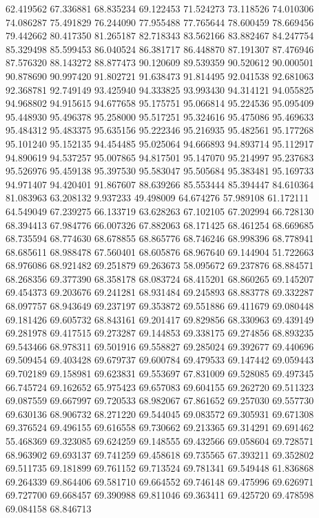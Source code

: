62.419562
67.336881
68.835234
69.122453
71.524273
73.118526
74.010306
74.086287
75.491829
76.244090
77.955488
77.765644
78.600459
78.669456
79.442662
80.417350
81.265187
82.718343
83.562166
83.882467
84.247754
85.329498
85.599453
86.040524
86.381717
86.448870
87.191307
87.476946
87.576320
88.143272
88.877473
90.120609
89.539359
90.520612
90.000501
90.878690
90.997420
91.802721
91.638473
91.814495
92.041538
92.681063
92.368781
92.749149
93.425940
94.333825
93.993430
94.314121
94.055825
94.968802
94.915615
94.677658
95.175751
95.066814
95.224536
95.095409
95.448930
95.496378
95.258000
95.517251
95.324616
95.475086
95.469633
95.484312
95.483375
95.635156
95.222346
95.216935
95.482561
95.177268
95.101240
95.152135
94.454485
95.025064
94.666893
94.893714
95.112917
94.890619
94.537257
95.007865
94.817501
95.147070
95.214997
95.237683
95.526976
95.459138
95.397530
95.583047
95.505684
95.383481
95.169733
94.971407
94.420401
91.867607
88.639266
85.553444
85.394447
84.610364
81.083963
63.208132
9.937233
49.498009
64.674276
57.989108
61.172111
64.549049
67.239275
66.133719
63.628263
67.102105
67.202994
66.728130
68.394413
67.984776
66.007326
67.882063
68.171425
68.461254
68.669685
68.735594
68.774630
68.678855
68.865776
68.746246
68.998396
68.778941
68.685611
68.988478
67.560401
68.605876
68.967640
69.144904
51.722663
68.976086
68.921482
69.251879
69.263673
58.095672
69.237876
68.884571
68.268356
69.377390
68.358178
68.083724
68.415201
68.860265
69.145207
69.454373
69.203676
69.241281
68.931484
69.245893
68.883778
69.332287
68.097757
68.943649
69.237197
69.353872
69.551886
69.411679
69.080448
69.181426
69.605732
68.843161
69.201417
69.829856
68.330963
69.439149
69.281978
69.417515
69.273287
69.144853
69.338175
69.274856
68.893235
69.543466
68.978311
69.501916
69.558827
69.285024
69.392677
69.440696
69.509454
69.403428
69.679737
69.600784
69.479533
69.147442
69.059443
69.702189
69.158981
69.623831
69.553697
67.831009
69.528085
69.497345
66.745724
69.162652
65.975423
69.657083
69.604155
69.262720
69.511323
69.087559
69.667997
69.720533
68.982067
67.861652
69.257030
69.557730
69.630136
68.906732
68.271220
69.544045
69.083572
69.305931
69.671308
69.376524
69.496155
69.616558
69.730662
69.213365
69.314291
69.691462
55.468369
69.323085
69.624259
69.148555
69.432566
69.058604
69.728571
68.963902
69.693137
69.741259
69.458618
69.735565
67.393211
69.352802
69.511735
69.181899
69.761152
69.713524
69.781341
69.549448
61.836868
69.264339
69.864406
69.581710
69.664552
69.746148
69.475996
69.626971
69.727700
69.668457
69.390988
69.811046
69.363411
69.425720
69.478598
69.084158
68.846713
